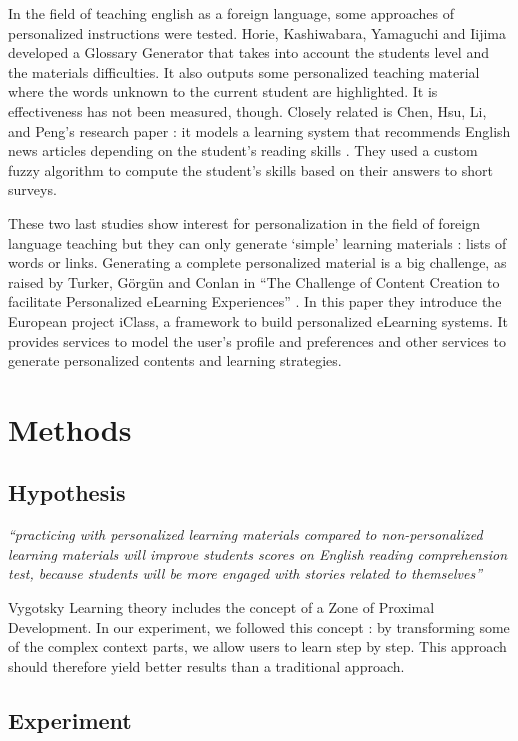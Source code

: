 \documentclass[a4paper,12pt]{article}
\begin{document}
In the field of teaching english as a foreign language, some approaches of personalized instructions were tested. Horie, Kashiwabara, Yamaguchi and Iijima developed a Glossary Generator \cite{iijima_wordlist_generator} that takes into account the students level and the materials difficulties. It also outputs some personalized teaching material where the words unknown to the current student are highlighted. It is effectiveness has not been measured, though. Closely related is Chen, Hsu, Li, and Peng's research paper : it models a learning system that recommends English news articles depending on the student's reading skills \cite{chen_mlearning}. They used a custom fuzzy algorithm to compute the student's skills based on their answers to short surveys.

These two last studies show interest for personalization in the field of foreign language teaching but they can only generate `simple' learning materials : lists of words or links. Generating a complete personalized material is a big challenge, as raised by Turker, Görgün and Conlan in ``The Challenge of Content Creation to facilitate Personalized eLearning Experiences'' \cite{turker_challenge_creation}. In this paper they introduce the European project iClass, a framework to build personalized eLearning systems. It provides services to model the user's profile and preferences and other services to generate personalized contents and learning strategies.


\section{Methods}

\subsection{Hypothesis}

\textit{``practicing with personalized learning materials compared to non-personalized learning materials will improve students scores on English reading comprehension test, because students will be more engaged with stories related to themselves''}

Vygotsky Learning theory includes the concept of a Zone of Proximal Development. In our experiment, we followed this concept : by transforming some of the complex context parts, we allow users to learn step by step. This approach should therefore yield better results than a traditional approach.

\subsection{Experiment}
\end{document}
